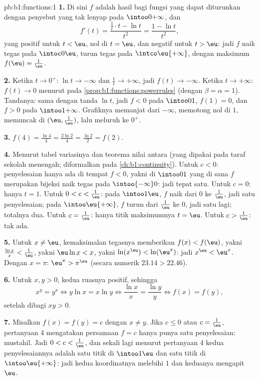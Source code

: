 \begin{solution}{pb:b1:functions:1}
\textbf{1.} Di sini $f$ adalah hasil bagi fungsi yang dapat diturunkan dengan
penyebut yang tak lenyap pada $\intoo0{+\infty}$, dan
\[
f'(t) = \frac{\frac1t \cdot t - \ln t}{t^2} = \frac{1 - \ln
t}{t^2} ,
\]
yang positif untuk $t < \eu$, nol di $t = \eu$, dan negatif untuk $t > \eu$:
jadi $f$ naik tegas pada $\intoc0\eu$, turun tegas pada
$\intco\eu{+\infty}$, dengan maksimum $f(\eu) = \frac1\eu$.

\textbf{2.} Ketika $t \to 0^+$: $\ln t \to -\infty$ dan $\frac1t \to
+\infty$, jadi $f(t) \to -\infty$. Ketika $t \to +\infty$: $f(t) \to 0$
menurut  pada \cref{prop:b1:functions:powerrules}
(dengan $\beta = \alpha = 1$). Tandanya: sama dengan tanda $\ln t$, jadi $f < 0$ pada
$\intoo01$, $f(1) = 0$, dan $f > 0$ pada $\intoo1{+\infty}$. Grafiknya
memanjat dari $-\infty$, memotong nol di $1$, memuncak di $(\eu,
\frac1\eu)$, lalu meluruh ke $0^+$.

\textbf{3.} $f(4) = \frac{\ln 4}4 = \frac{2\ln 2}4 = \frac{\ln 2}2
= f(2)$.

\textbf{4.} Menurut tabel variasinya dan teorema nilai
antara (yang dipakai pada taraf sekolah menengah; diformalkan pada
\cref{ch:b1:continuity}). Untuk $c < 0$: penyelesaian hanya ada di tempat
$f < 0$, yakni di $\intoo01$ yang di sana $f$ merupakan bijeksi naik
tegas pada $\intoo{-\infty}0$: jadi tepat satu. Untuk $c = 0$: hanya
$t = 1$. Untuk $0 < c < \frac1\eu$: pada $\intoo1\eu$, $f$ naik
dari $0$ ke $\frac1\eu$, jadi satu penyelesaian; pada $\intoo\eu{+\infty}$,
$f$ turun dari $\frac1\eu$ ke $0$, jadi satu lagi; totalnya dua. Untuk
$c = \frac1\eu$: hanya titik maksimumnya $t = \eu$. Untuk $c >
\frac1\eu$: tak ada.

\textbf{5.} Untuk $x \neq \eu$, kemaksimalan tegasnya memberikan $f(x) <
f(\eu)$, yakni $\frac{\ln x}x < \frac1\eu$, yakni $\eu\ln x < x$,
yakni $\ln(x^\eu) < \ln(\eu^x)$: jadi $x^\eu < \eu^x$. Dengan $x = \pi$:
$\eu^\pi > \pi^\eu$ (secara numerik $23.14 > 22.46$).

\textbf{6.} Untuk $x, y > 0$, kedua ruasnya positif, sehingga
\[
x^y = y^x \iff y\ln x = x\ln y \iff \frac{\ln x}x = \frac{\ln y}y
\iff f(x) = f(y) ,
\]
setelah dibagi $xy > 0$.

\textbf{7.} Misalkan $f(x) = f(y) = c$ dengan $x \neq y$. Jika $c \leq 0$ atau
$c = \frac1\eu$, pertanyaan 4 mengatakan persamaan $f = c$ hanya punya satu
penyelesaian: mustahil. Jadi $0 < c < \frac1\eu$, dan sekali lagi menurut
pertanyaan 4 kedua penyelesaiannya adalah satu titik di $\intoo1\eu$ dan satu titik
di $\intoo\eu{+\infty}$: jadi kedua koordinatnya melebihi $1$ dan keduanya
mengapit $\eu$.


\end{solution}
